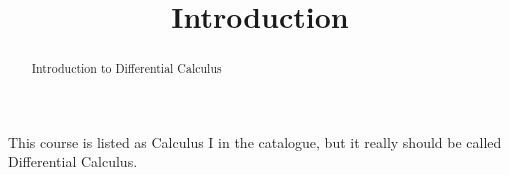 \documentclass{ximera}
\title{Introduction}
\begin{document}
\begin{abstract}
Introduction to Differential Calculus
\end{abstract}
\maketitle


This course is listed as Calculus I in the catalogue, but it really should be called Differential Calculus.
\end{document}
